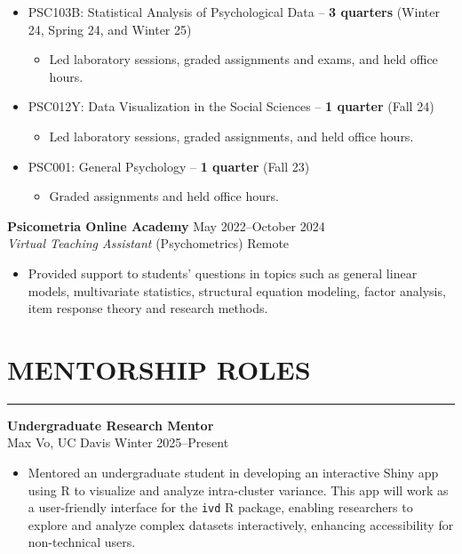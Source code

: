 \documentclass[10pt,]{article}
\providecommand{\tightlist}{%
  \setlength{\itemsep}{0pt}\setlength{\parskip}{0pt}}
\begin{document}
\begin{itemize}
\tightlist
\item
  PSC103B: Statistical Analysis of Psychological Data -- \textbf{3
  quarters} (Winter 24, Spring 24, and Winter 25)

  \begin{itemize}
  \tightlist
  \item
    Led laboratory sessions, graded assignments and exams, and held
    office hours.
  \end{itemize}
\item
  PSC012Y: Data Visualization in the Social Sciences -- \textbf{1
  quarter} (Fall 24)

  \begin{itemize}
  \tightlist
  \item
    Led laboratory sessions, graded assignments, and held office hours.
  \end{itemize}
\item
  PSC001: General Psychology -- \textbf{1 quarter} (Fall 23)

  \begin{itemize}
  \tightlist
  \item
    Graded assignments and held office hours.
  \end{itemize}
\end{itemize}

\textbf{Psicometria Online Academy} \hfill May 2022--October 2024\\
\emph{Virtual Teaching Assistant} (Psychometrics) \hfill Remote

\begin{itemize}
\tightlist
\item
  Provided support to students' questions in topics such as general
  linear models, multivariate statistics, structural equation modeling,
  factor analysis, item response theory and research methods.
\end{itemize}

\section{MENTORSHIP ROLES}\label{mentorship-roles}

\hrule

\textbf{Undergraduate Research Mentor}\\
Max Vo, UC Davis \hfill Winter 2025--Present

\begin{itemize}
\tightlist
\item
  Mentored an undergraduate student in developing an interactive Shiny
  app using R to visualize and analyze intra-cluster variance. This app
  will work as a user-friendly interface for the \texttt{ivd} R package,
  enabling researchers to explore and analyze complex datasets
  interactively, enhancing accessibility for non-technical users.
\end{itemize}
\end{document}
